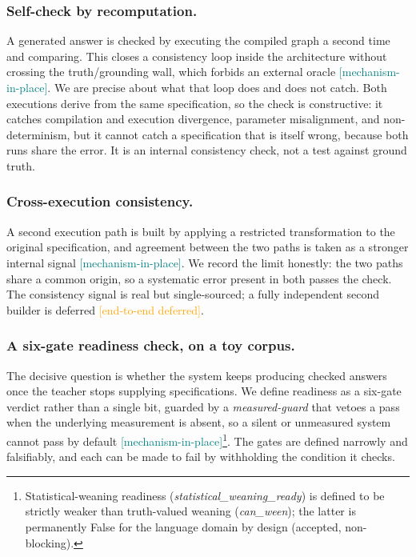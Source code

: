 \documentclass[11pt,a4paper]{article}
\newcommand{\statusmech}{\textcolor{teal}{\small\textsf{[mechanism-in-place]}}}
\newcommand{\statusdeferred}{\textcolor{orange}{\small\textsf{[end-to-end deferred]}}}
\newcommand{\footnoteweaning}{\footnote{Statistical-weaning readiness
  (\textit{statistical\_weaning\_ready}) is defined to be strictly weaker than
  truth-valued weaning (\textit{can\_ween}); the latter is permanently False
  for the language domain by design (accepted, non-blocking).}}
\begin{document}
\subsubsection*{Self-check by recomputation.}
A generated answer is checked by executing the compiled graph a second
time and comparing. This closes a consistency loop inside the
architecture without crossing the truth/grounding wall, which forbids an
external oracle \statusmech. We are precise about what that loop does
and does not catch. Both executions derive from the same specification,
so the check is constructive: it catches compilation and execution
divergence, parameter misalignment, and non-determinism, but it cannot
catch a specification that is itself wrong, because both runs share the
error. It is an internal consistency check, not a test against ground
truth.

\subsubsection*{Cross-execution consistency.}
A second execution path is built by applying a restricted transformation
to the original specification, and agreement between the two paths is
taken as a stronger internal signal \statusmech. We record the limit
honestly: the two paths share a common origin, so a systematic error
present in both passes the check. The consistency signal is real but
single-sourced; a fully independent second builder is deferred
\statusdeferred.

\subsubsection*{A six-gate readiness check, on a toy corpus.}
The decisive question is whether the system keeps producing checked
answers once the teacher stops supplying specifications. We define
readiness as a six-gate verdict rather than a single bit, guarded by a
\emph{measured-guard} that vetoes a pass when the underlying measurement
is absent, so a silent or unmeasured system cannot pass by default
\statusmech\footnoteweaning. The gates are defined narrowly and
falsifiably, and each can be made to fail by withholding the condition
it checks.
\end{document}
